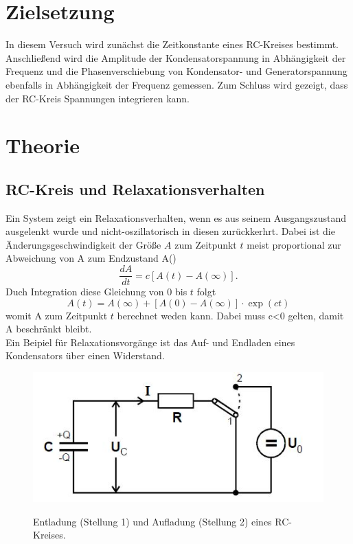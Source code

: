\section{Zielsetzung}
In diesem Versuch wird zunächst die Zeitkonstante eines RC-Kreises bestimmt.
Anschließend wird die Amplitude der Kondensatorspannung in Abhängigkeit der Frequenz und
die Phasenverschiebung von Kondensator- und Generatorspannung ebenfalls in Abhängigkeit der
Frequenz gemessen. Zum Schluss wird gezeigt, dass der RC-Kreis Spannungen
integrieren kann.

\section{Theorie}
\subsection{RC-Kreis und Relaxationsverhalten}
Ein System zeigt ein Relaxationsverhalten, wenn es aus seinem Ausgangszustand
ausgelenkt wurde und nicht-oszillatorisch in diesen zurückkerhrt. Dabei ist die
Änderungsgeschwindigkeit der Größe $A$ zum Zeitpunkt $t$ meist proportional zur
Abweichung von A zum Endzustand A(\infty)
\begin{equation}
  \frac{dA}{dt} = c[A(t)-A(\infty)].
  \label{eqn:diff1}
\end{equation}
Duch Integration diese Gleichung von 0 bis $t$ folgt
\begin{equation}
  A(t)=A(\infty)+[A(0)-A(\infty)] \cdot \exp{(ct)}
\end{equation}
womit A zum Zeitpunkt $t$ berechnet weden kann.
Dabei muss c<0 gelten, damit A beschränkt bleibt. \\

Ein Beipiel für Relaxationsvorgänge ist das Auf- und Endladen eines Kondensators
über einen Widerstand.
\begin{figure}[H]
  \centering
  \includegraphics[height=5cm]{RC.JPG}
  \cite{skript}
  \caption{Entladung (Stellung 1) und Aufladung (Stellung 2) eines RC-Kreises.}
  \label{fig:RC}
  \end{figure}

